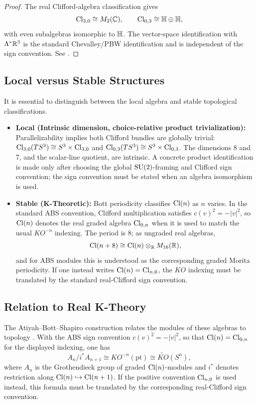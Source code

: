 \documentclass[11pt]{article}
\begin{document}
\begin{proof}
The real Clifford-algebra classification gives
\[
  \operatorname{Cl}_{3,0}\cong M_2(\mathbb{C}),
  \qquad
  \operatorname{Cl}_{0,3}\cong \mathbb{H}\oplus\mathbb{H},
\]
with even subalgebras isomorphic to \(\mathbb{H}\).  The vector-space identification
with \(\Lambda^*\mathbb{R}^3\) is the standard Chevalley/\allowbreak PBW
identification and is independent of the sign convention.  See
\cite{lawson1989spin}.
\end{proof}


\subsection{Local versus Stable Structures}

It is essential to distinguish between the local algebra and stable topological classifications.

\begin{itemize}
    \item \textbf{Local (Intrinsic dimension, choice-relative product trivialization):} Parallelizability implies both Clifford bundles are globally trivial: $\operatorname{Cl}_{3,0}(TS^3) \cong S^3 \times \operatorname{Cl}_{3,0}$ and $\operatorname{Cl}_{0,3}(TS^3) \cong S^3 \times \operatorname{Cl}_{0,3}$. The dimensions $8$ and $7$, and the scalar-line quotient, are intrinsic. A concrete product identification is made only after choosing the global $\mathrm{SU}(2)$-framing and Clifford sign convention; the sign convention must be stated when an algebra isomorphism is used.
    \item \textbf{Stable (K-Theoretic):} Bott periodicity classifies $\operatorname{Cl}(n)$ as $n$ varies. In the standard ABS convention, Clifford multiplication satisfies $c(v)^2=-|v|^2$, so $\operatorname{Cl}(n)$ denotes the real graded algebra $\operatorname{Cl}_{0,n}$ when it is used to match the usual $KO^{-n}$ indexing. The period is 8; as ungraded real algebras,
    \[
    \operatorname{Cl}(n+8) \cong \operatorname{Cl}(n) \otimes_{\mathbb{R}} M_{16}(\mathbb{R}),
    \]
    and for ABS modules this is understood as the corresponding graded Morita periodicity. If one instead writes $\operatorname{Cl}(n)=\operatorname{Cl}_{n,0}$, the $KO$ indexing must be translated by the standard real-Clifford sign convention.
\end{itemize}

\subsection{Relation to Real K-Theory}

The Atiyah--Bott--Shapiro construction relates the modules of these algebras to topology \cite{abs,bott1959stable}. With the ABS sign convention $c(v)^2=-|v|^2$, so that $\operatorname{Cl}(n)=\operatorname{Cl}_{0,n}$ for the displayed indexing, one has
\[
A_n / i^*A_{n+1} \cong KO^{-n}(\mathrm{pt})\cong \widetilde{KO}(S^n),
\]
where $A_n$ is the Grothendieck group of graded $\operatorname{Cl}(n)$-modules and $i^*$ denotes restriction along $\operatorname{Cl}(n)\hookrightarrow\operatorname{Cl}(n+1)$. If the positive convention $\operatorname{Cl}_{n,0}$ is used instead, this formula must be translated by the corresponding real-Clifford sign convention.
\end{document}
